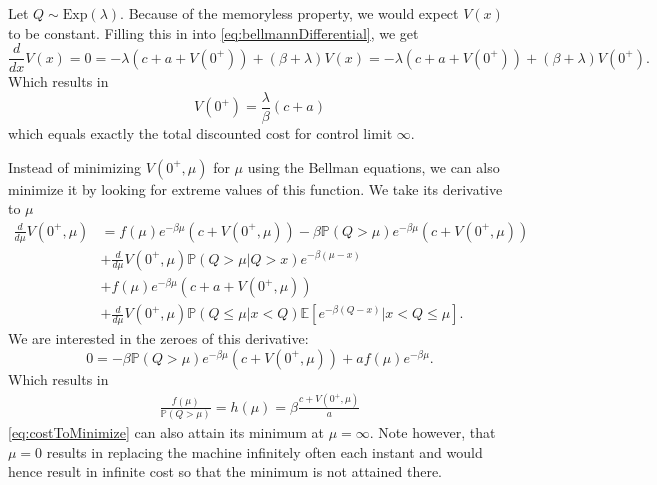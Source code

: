 \begin{example}
Let $Q\sim\text{Exp}(\lambda)$.
Because of the memoryless property, we would expect $V(x)$ to be constant.
Filling this in into \eqref{eq:bellmannDifferential}, we get
$$
\frac{d}{dx}V(x)=0=-\lambda(c+a+ V(0^+))+(\beta+ \lambda) V(x)=-\lambda(c+a+ V(0^+))+(\beta+ \lambda) V(0^+).
$$
Which results in
$$
V(0^+)=\frac{\lambda}{\beta}(c+a)
$$
which equals exactly the total discounted cost for control limit $\infty$.
\end{example}

Instead of minimizing $V(0^+,\mu)$ for $\mu$ using the Bellman equations, we can also minimize it by looking for extreme values of this function.
We take its derivative to $\mu$
\begin{equation}
\begin{split}
\frac{d}{d\mu}V(0^+,\mu)&=f(\mu)e^{-\beta \mu}(c+V(0^+,\mu))-\beta\mathbb{P}(Q>\mu)e^{-\beta \mu}(c+V(0^+,\mu))\\
&+\frac{d}{d\mu}V(0^+,\mu)\mathbb{P}(Q>\mu|Q>x)e^{-\beta (\mu-x)}\\
&+f(\mu)e^{-\beta \mu}(c+a+V(0^+,\mu))\\
&+\frac{d}{d\mu}V(0^+,\mu)\mathbb{P}(Q\leq \mu|x<Q)\mathbb{E}[e^{-\beta (Q-x)}|x<Q\leq \mu].
\end{split}
\end{equation}
We are interested in the zeroes of this derivative:
$$
0=-\beta\mathbb{P}(Q>\mu)e^{-\beta \mu}(c+V(0^+,\mu))+af(\mu)e^{-\beta \mu}.
$$
Which results in
\begin{equation}\label{eq:hazardBound}
\begin{split}
\frac{f(\mu)}{\mathbb{P}(Q>\mu)}=h(\mu)=\beta\frac{c+V(0^+,\mu)}{a}
\end{split}
\end{equation}
\eqref{eq:costToMinimize} can also attain its minimum at $\mu=\infty$.
Note however, that $\mu=0$ results in replacing the machine infinitely often each instant and would hence result in infinite cost so that the minimum is not attained there.\

